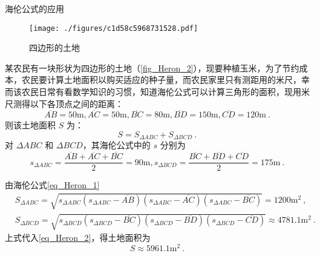 \begin{example}{海伦公式的应用}
\begin{figure}[ht]
\centering
\texttt{[image: ./figures/c1d58c5968731528.pdf]}
\caption{四边形的土地}\label{fig_Heron_2}
\end{figure}
某农民有一块形状为四边形的土地（\autoref{fig_Heron_2}），现要种植玉米，为了节约成本，农民要计算土地面积以购买适应的种子量，而农民家里只有测距用的米尺，幸而该农民日常有看数学知识的习惯，知道海伦公式可以计算三角形的面积，现用米尺测得以下各顶点之间的距离：
\begin{equation}
\overline{AB}=50\mathrm{m},\overline{AC}=50\mathrm{m},\overline{BC}=80\mathrm{m},\overline{BD}=150\mathrm{m},\overline{CD}=120\mathrm{m}~.
\end{equation}
则该土地面积 $S$ 为：
\begin{equation}\label{eq_Heron_2}
S=S_{\Delta ABC}+S_{\Delta BCD}~.
\end{equation}
对 $\Delta ABC$ 和 $\Delta BCD$，其海伦公式中的 $s$ 分别为
\begin{equation}
s_{\Delta ABC}=\frac{\overline{AB}+\overline{AC}+\overline{BC}}{2}=90\mathrm{m}
,
s_{\Delta BCD}=\frac{\overline{BC}+\overline{BD}+\overline{CD}}{2}=175\mathrm{m}~.
\end{equation}


由海伦公式\autoref{eq_Heron_1} 
\begin{equation}
\begin{aligned}
&S_{\Delta ABC}=\sqrt{s_{\Delta ABC}(s_{\Delta ABC}-\overline{AB})(s_{\Delta ABC}-\overline{AC})(s_{\Delta ABC}-\overline{BC})}=1200\mathrm{m^2}~,
\\
&S_{\Delta BCD}=\sqrt{s_{\Delta BCD}(s_{\Delta BCD}-\overline{BC})(s_{\Delta BCD}-\overline{BD})(s_{\Delta BCD}-\overline{CD})}\approx 4781.1\mathrm{m^2}~.
\end{aligned}
\end{equation}
上式代入\autoref{eq_Heron_2}，得土地面积为
\begin{equation}
S\approx 5961.1\mathrm{m^2}~.
\end{equation}
\end{example}
